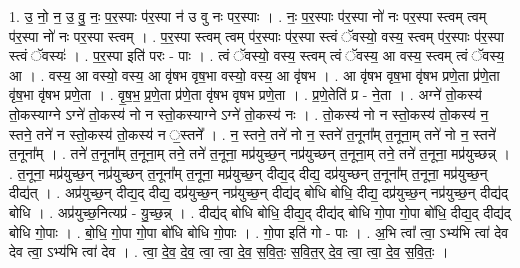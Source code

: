 \documentclass[17pt]{extarticle}
\begin{document}
1. उ॒ नो॒ न॒ उ॒ वु॒ नः॒ प॒र॒स्पाः प॑र॒स्पा न॑ उ वु नः पर॒स्पाः । . नः॒ प॒र॒स्पाः प॑र॒स्पा नो॑ नः पर॒स्पा स्त्वम् त्वम् प॑र॒स्पा नो॑ नः पर॒स्पा स्त्वम् । . प॒र॒स्पा स्त्वम् त्वम् प॑र॒स्पाः प॑र॒स्पा स्त्वं ॅवस्यो॒ वस्य॒ स्त्वम् प॑र॒स्पाः प॑र॒स्पा स्त्वं ॅवस्यः॑ । . प॒र॒स्पा इति॑ परः - पाः । . त्वं ॅवस्यो॒ वस्य॒ स्त्वम् त्वं ॅवस्य॒ आ वस्य॒ स्त्वम् त्वं ॅवस्य॒ आ । . वस्य॒ आ वस्यो॒ वस्य॒ आ वृ॑षभ वृष॒भा वस्यो॒ वस्य॒ आ वृ॑षभ । . आ वृ॑षभ वृष॒भा वृ॑षभ प्रणे॒ता प्र॑णे॒ता वृ॑ष॒भा वृ॑षभ प्रणे॒ता । . वृ॒ष॒भ॒ प्र॒णे॒ता प्र॑णे॒ता वृ॑षभ वृषभ प्रणे॒ता । . प्र॒णे॒तेति॑ प्र - ने॒ता । . अग्ने॑ तो॒कस्य॑ तो॒कस्याग्ने ऽग्ने॑ तो॒कस्य॑ नो न स्तो॒कस्याग्ने ऽग्ने॑ तो॒कस्य॑ नः । . तो॒कस्य॑ नो न स्तो॒कस्य॑ तो॒कस्य॑ न॒ स्तने॒ तने॑ न स्तो॒कस्य॑ तो॒कस्य॑ न ॒स्तने᳚ । . न॒ स्तने॒ तने॑ नो न॒ स्तने॑ त॒नूना᳚म् त॒नूना॒म् तने॑ नो न॒ स्तने॑ त॒नूना᳚म् । . तने॑ त॒नूना᳚म् त॒नूना॒म् तने॒ तने॑ त॒नूना॒ मप्र॑युच्छ॒न् नप्र॑युच्छन् त॒नूना॒म् तने॒ तने॑ त॒नूना॒ मप्र॑युच्छन्न् । . त॒नूना॒ मप्र॑युच्छ॒न् नप्र॑युच्छन् त॒नूना᳚म् त॒नूना॒ मप्र॑युच्छ॒न् दीद्य॒द् दीद्य॒ दप्र॑युच्छन् त॒नूना᳚म् त॒नूना॒ मप्र॑युच्छ॒न् दीद्य॑त् । . अप्र॑युच्छ॒न् दीद्य॒द् दीद्य॒ दप्र॑युच्छ॒न् नप्र॑युच्छ॒न् दीद्य॑द् बोधि बोधि॒ दीद्य॒ दप्र॑युच्छ॒न् नप्र॑युच्छ॒न् दीद्य॑द् बोधि । . अप्र॑युच्छ॒नित्यप्र॑ - यु॒च्छ॒न्न् । . दीद्य॑द् बोधि बोधि॒ दीद्य॒द् दीद्य॑द् बोधि गो॒पा गो॒पा बो॑धि॒ दीद्य॒द् दीद्य॑द् बोधि गो॒पाः । . बो॒धि॒ गो॒पा गो॒पा बो॑धि बोधि गो॒पाः । . गो॒पा इति॑ गो - पाः । . अ॒भि त्वा᳚ त्वा॒ ऽभ्य॑भि त्वा॑ देव देव त्वा॒ ऽभ्य॑भि त्वा॑ देव । . त्वा॒ दे॒व॒ दे॒व॒ त्वा॒ त्वा॒ दे॒व॒ स॒वि॒तः॒ स॒वि॒त॒र् दे॒व॒ त्वा॒ त्वा॒ दे॒व॒ स॒वि॒तः॒ । \newline
\end{document}
